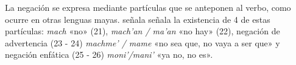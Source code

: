 La negación se expresa mediante partículas que se anteponen al verbo, como ocurre en otras lenguas mayas. \textcolor{MidnightBlue}{\citet{ChontalTabasco}} señala señala la existencia de 4 de estas partículas: \textit{mach} «no» (21), \textit{mach'an / ma'an} «no hay» (22), negación de advertencia (23 - 24) \textit{machme' / mame} «no sea que, no vaya a ser que» y negación enfática (25 - 26) \textit{moni'/mani'} «ya no, no es».